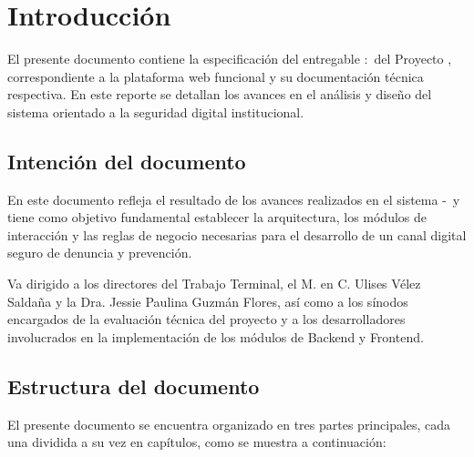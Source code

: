 \chapter{Introducción}
\label{ch:introduccion}

    El presente documento contiene la especificación del entregable \varCveEntregable:\varEntregable\ del Proyecto \varProyecto, correspondiente a la plataforma web funcional y su documentación técnica respectiva. En este reporte se detallan los avances en el análisis y diseño del sistema orientado a la seguridad digital institucional.

    \section{Intención del documento}

        En este documento refleja el resultado de los avances realizados en el sistema \varCveSistema-\varSistema\ y tiene como objetivo fundamental establecer la arquitectura, los módulos de interacción y las reglas de negocio necesarias para el desarrollo de un canal digital seguro de denuncia y prevención.

        Va dirigido a los directores del Trabajo Terminal, el M. en C. Ulises Vélez Saldaña y la Dra. Jessie Paulina Guzmán Flores, así como a los sínodos encargados de la evaluación técnica del proyecto y a los desarrolladores involucrados en la implementación de los módulos de Backend y Frontend.

    \section{Estructura del documento}

        El presente documento se encuentra organizado en tres partes principales, cada una dividida a su vez en capítulos, como se muestra a continuación:

